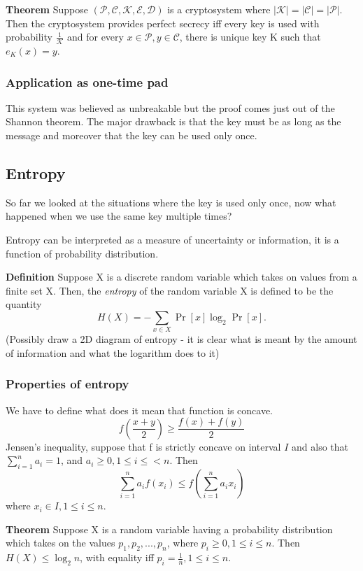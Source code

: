 \documentclass[a4paper,10pt]{article}
\newcommand{\mc}[1]{\ensuremath{\mathcal{#1}}}
\begin{document}
\noindent
\textbf{Theorem} Suppose $(\mc{P},\mc{C},\mc{K},\mc{E},\mc{D})$ is a cryptosystem where $|\mc{K}| = |\mc{C}| = |\mc{P}|$. Then the cryptosystem provides perfect secrecy iff every key is used with probability $\frac{1}{\mc{K}}$ and for every $x \in \mc{P}, y \in \mc{C}$, there is unique key K such that $e_K(x) = y$.

\subsubsection*{Application as one-time pad}
This system was believed as unbreakable but the proof comes just out of the Shannon theorem. The major drawback is that the key must be as long as the message and moreover that the key can be used only once. 

\subsection*{Entropy}
So far we looked at the situations where the key is used only once, now what happened when we use the same key multiple times?

Entropy can be interpreted as a measure of uncertainty or information, it is a function of probability distribution.

\noindent
\textbf{Definition}
Suppose X is a discrete random variable which takes on values from a finite set X. Then, the \textit{entropy} of the random variable X is defined to be the quantity
$$
H(X) = -\sum_{x\in X} \Pr[x]\log_2\Pr[x].
$$
(Possibly draw a 2D diagram of entropy - it is clear what is meant by the amount of information and what the logarithm does to it)

\subsubsection*{Properties of entropy}
We have to define what does it mean that function is concave.
$$
f\left( \frac{x+y}{2} \right) \geq \frac{f(x)+f(y)}{2}
$$
Jensen's inequality, suppose that f is strictly concave on interval $ I $ and also that $\sum_{i=1}^n a_i = 1$, and $a_i \geq 0, 1 \leq i \leq < n$. Then
$$
\sum_{i=1}^n a_i f(x_i) \leq f \left( \sum_{i=1}^n a_i x_i \right)
$$
where $x_i \in I, 1\leq i \leq n$.

\noindent
\textbf{Theorem} Suppose X is a random variable having a probability distribution which takes on the values $p_1,p_2,...,p_n$, where $ p_i \ge 0,1 \leq i \leq n$. Then $H(X) \leq \log_2 n$, with equality iff $p_i = \frac{1}{n},1 \leq i \leq n$.
\end{document}
